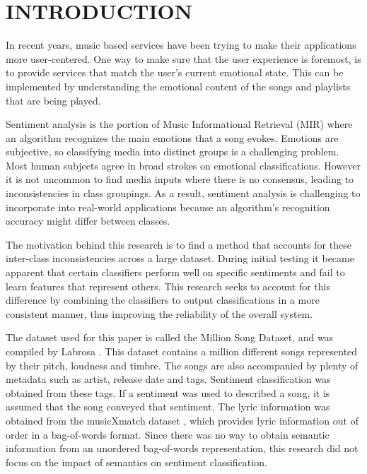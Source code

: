 \renewcommand{\chaptername}{}

\chapter{INTRODUCTION}

In recent years, music based services have been trying to make their 
applications more user-centered. One way to make sure that the 
user experience is foremost, is to provide services that match the user's 
current emotional state. This can be implemented by understanding 
the emotional content of the songs and playlists that are being played. 

Sentiment analysis is the portion of Music Informational Retrieval (MIR) 
where an algorithm recognizes the main emotions that a song evokes. 
Emotions are subjective, so classifying media into distinct groups 
is a challenging problem. Most human subjects agree in broad 
strokes on emotional classifications. However it is not uncommon
 to find media inputs where there is no consensus, leading to 
 inconsistencies in class groupings. As a result, sentiment analysis 
 is challenging to incorporate into real-world applications 
 because an algorithm's recognition accuracy might differ between classes. 
 
  The motivation behind this research is to find a method that accounts for 
  these inter-class inconsistencies across a large dataset.  During initial 
  testing it became apparent that certain classifiers perform well on specific 
  sentiments and fail to learn features that represent others. This 
  research seeks to account for this difference by combining the classifiers 
  to output classifications in a  more consistent manner, thus improving the 
  reliability of the overall system. 
  
  The dataset used for this paper is called the Million Song Dataset, and 
  was compiled by Labrosa \cite{Bertin-Mahieux2011}. This dataset contains a million different songs
  represented by their pitch, loudness and timbre. The songs are also accompanied 
  by plenty of metadata such as artist, release date and  tags. Sentiment classification
   was obtained from these tags. If a sentiment was used to described a song, it is assumed that 
  the song conveyed that sentiment. The lyric information was obtained from the
  musicXmatch dataset  \cite{musicXmatchDataset}, which provides lyric information out of order in a 
  bag-of-words format. Since there was no way to obtain semantic information 
  from an unordered bag-of-words representation, this research did not focus 
  on the impact of semantics on sentiment classification. 
      
